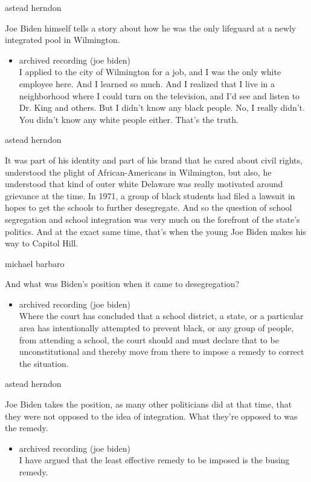 astead herndon

Joe Biden himself tells a story about how he was the only lifeguard at a
newly integrated pool in Wilmington.

\begin{itemize}
\tightlist
\item
  archived recording (joe biden)\\
  I applied to the city of Wilmington for a job, and I was the only
  white employee here. And I learned so much. And I realized that I live
  in a neighborhood where I could turn on the television, and I'd see
  and listen to Dr. King and others. But I didn't know any black people.
  No, I really didn't. You didn't know any white people either. That's
  the truth.
\end{itemize}

astead herndon

It was part of his identity and part of his brand that he cared about
civil rights, understood the plight of African-Americans in Wilmington,
but also, he understood that kind of outer white Delaware was really
motivated around grievance at the time. In 1971, a group of black
students had filed a lawsuit in hopes to get the schools to further
desegregate. And so the question of school segregation and school
integration was very much on the forefront of the state's politics. And
at the exact same time, that's when the young Joe Biden makes his way to
Capitol Hill.

michael barbaro

And what was Biden's position when it came to desegregation?

\begin{itemize}
\tightlist
\item
  archived recording (joe biden)\\
  Where the court has concluded that a school district, a state, or a
  particular area has intentionally attempted to prevent black, or any
  group of people, from attending a school, the court should and must
  declare that to be unconstitutional and thereby move from there to
  impose a remedy to correct the situation.
\end{itemize}

astead herndon

Joe Biden takes the position, as many other politicians did at that
time, that they were not opposed to the idea of integration. What
they're opposed to was the remedy.

\begin{itemize}
\tightlist
\item
  archived recording (joe biden)\\
  I have argued that the least effective remedy to be imposed is the
  busing remedy.
\end{itemize}

